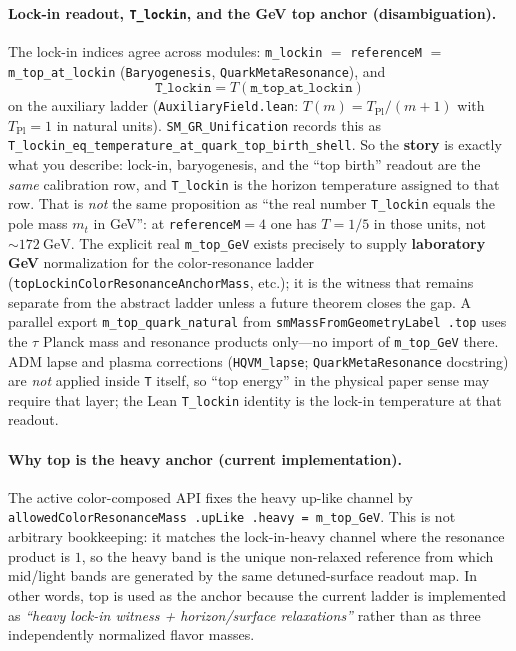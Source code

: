 \documentclass[11pt]{article}
\begin{document}
\paragraph{Lock-in readout, \texttt{T\_lockin}, and the GeV top anchor (disambiguation).}
The lock-in indices agree across modules: \texttt{m\_lockin} $=$ \texttt{referenceM} $=$ \texttt{m\_top\_at\_lockin} (\texttt{Baryogenesis}, \texttt{QuarkMetaResonance}), and
\[
  \texttt{T\_lockin} = T(\texttt{m\_top\_at\_lockin})
\]
on the auxiliary ladder (\texttt{AuxiliaryField.lean}: $T(m)=T_{\mathrm{Pl}}/(m+1)$ with $T_{\mathrm{Pl}}=1$ in natural units). \texttt{SM\_GR\_Unification} records this as \texttt{T\_lockin\_eq\_temperature\_at\_quark\_top\_birth\_shell}. So the \textbf{story} is exactly what you describe: lock-in, baryogenesis, and the ``top birth'' readout are the \emph{same} calibration row, and \texttt{T\_lockin} is the horizon temperature assigned to that row. That is \emph{not} the same proposition as ``the real number \texttt{T\_lockin} equals the pole mass $m_t$ in GeV'': at \texttt{referenceM}$=4$ one has $T=1/5$ in those units, not $\sim 172\ \mathrm{GeV}$. The explicit real \texttt{m\_top\_GeV} exists precisely to supply \textbf{laboratory GeV} normalization for the color-resonance ladder (\texttt{topLockinColorResonanceAnchorMass}, etc.); it is the witness that remains separate from the abstract ladder unless a future theorem closes the gap. A parallel export \texttt{m\_top\_quark\_natural} from \texttt{smMassFromGeometryLabel\,.top} uses the $\tau$ Planck mass and resonance products only---no import of \texttt{m\_top\_GeV} there. ADM lapse and plasma corrections (\texttt{HQVM\_lapse}; \texttt{QuarkMetaResonance} docstring) are \emph{not} applied inside \texttt{T} itself, so ``top energy'' in the physical paper sense may require that layer; the Lean \texttt{T\_lockin} identity is the lock-in temperature at that readout.

\paragraph{Why top is the heavy anchor (current implementation).}
The active color-composed API fixes the heavy up-like channel by
\texttt{allowedColorResonanceMass\,.upLike\,.heavy = m\_top\_GeV}. This is not arbitrary bookkeeping: it
matches the lock-in-heavy channel where the resonance product is $1$, so the heavy band is the unique
non-relaxed reference from which mid/light bands are generated by the same detuned-surface readout map.
In other words, top is used as the anchor because the current ladder is implemented as
\emph{``heavy lock-in witness + horizon/surface relaxations''} rather than as three independently
normalized flavor masses.
\end{document}
